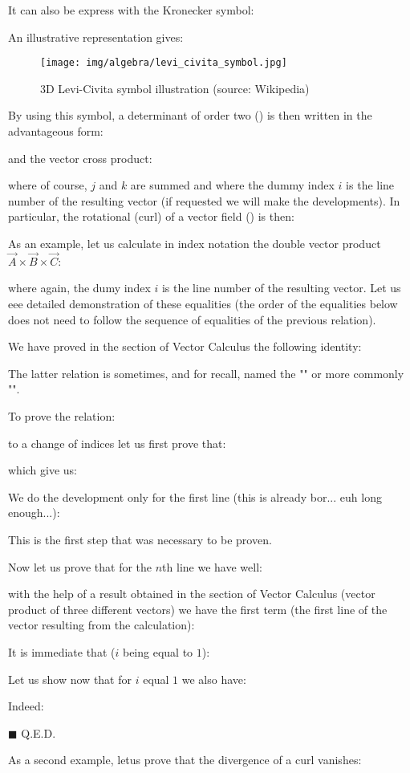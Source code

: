 	It can also be express with the Kronecker symbol:
	
	
	An illustrative representation gives:
	\begin{figure}[H]
		\centering
		\texttt{[image: img/algebra/levi\_civita\_symbol.jpg]}
		\caption[3D Levi-Civita symbol illustration]{3D Levi-Civita symbol illustration (source: Wikipedia)}
	\end{figure}
	By using this symbol, a determinant of order two () is then written in the advantageous form:
	
	and the vector cross product:
	
	where of course, $j$ and $k$ are summed and where the dummy index $i$ is the line number of the resulting vector (if requested we will make the developments). In particular, the rotational (curl) of a vector field () is then:
	   
	As an example, let us calculate in index notation the double vector product $\vec{A}\times\vec{B}\times\vec{C}$:
	 
	where again, the dumy index $i$ is the line number of the resulting vector. Let us eee detailed demonstration of these equalities (the order of the equalities below does not need to follow the sequence of equalities of the previous relation).
	\begin{dem}
	We have proved in the section of Vector Calculus the following identity:
	
	\begin{tcolorbox}[title=Remark,colframe=black,arc=10pt]
	The latter relation is sometimes, and for recall, named the "" or more commonly "".
	\end{tcolorbox}	
	To prove the relation:
	
	to a change of indices let us first prove that:
	
	which give us:
	
	We do the development only for the first line (this is already bor... euh long enough...):
	
	This is the first step that was necessary to be proven.
	
	Now let us prove that for the $n$th line we have well:
	
	with the help of a result obtained in the section of Vector Calculus (vector product of three different vectors) we have the first term (the first line of the vector resulting from the calculation):
	
	It is immediate that ($i$ being equal to $1$):
	
	Let us show now that for $i$ equal $1$ we also have:
	
	Indeed:
	
	\begin{flushright}
		$\blacksquare$  Q.E.D.
	\end{flushright}
	\end{dem}
	As a second example, letus prove that the divergence of a curl vanishes:
	
